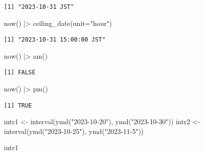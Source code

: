 \documentclass[
  letterpaper,
  DIV=11,
  numbers=noendperiod]{scrreprt}
\newenvironment{Shaded}{\begin{snugshade}}{\end{snugshade}}
\newcommand{\AttributeTok}[1]{\textcolor[rgb]{0.40,0.45,0.13}{#1}}
\newcommand{\FunctionTok}[1]{\textcolor[rgb]{0.28,0.35,0.67}{#1}}
\newcommand{\NormalTok}[1]{\textcolor[rgb]{0.00,0.23,0.31}{#1}}
\newcommand{\OtherTok}[1]{\textcolor[rgb]{0.00,0.23,0.31}{#1}}
\newcommand{\SpecialCharTok}[1]{\textcolor[rgb]{0.37,0.37,0.37}{#1}}
\newcommand{\StringTok}[1]{\textcolor[rgb]{0.13,0.47,0.30}{#1}}
\begin{document}
\begin{verbatim}
[1] "2023-10-31 JST"
\end{verbatim}

\begin{Shaded}
\begin{Highlighting}[]
\FunctionTok{now}\NormalTok{() }\SpecialCharTok{|\textgreater{}} \FunctionTok{ceiling\_date}\NormalTok{(}\AttributeTok{unit=}\StringTok{"hour"}\NormalTok{)}
\end{Highlighting}
\end{Shaded}

\begin{verbatim}
[1] "2023-10-31 15:00:00 JST"
\end{verbatim}

\begin{Shaded}
\begin{Highlighting}[]
\FunctionTok{now}\NormalTok{() }\SpecialCharTok{|\textgreater{}} \FunctionTok{am}\NormalTok{()}
\end{Highlighting}
\end{Shaded}

\begin{verbatim}
[1] FALSE
\end{verbatim}

\begin{Shaded}
\begin{Highlighting}[]
\FunctionTok{now}\NormalTok{() }\SpecialCharTok{|\textgreater{}} \FunctionTok{pm}\NormalTok{()}
\end{Highlighting}
\end{Shaded}

\begin{verbatim}
[1] TRUE
\end{verbatim}

\begin{Shaded}
\begin{Highlighting}[]
\NormalTok{intr1 }\OtherTok{\textless{}{-}}  \FunctionTok{interval}\NormalTok{(}\FunctionTok{ymd}\NormalTok{(}\StringTok{"2023{-}10{-}20"}\NormalTok{), }\FunctionTok{ymd}\NormalTok{(}\StringTok{"2023{-}10{-}30"}\NormalTok{))}
\NormalTok{intr2 }\OtherTok{\textless{}{-}}  \FunctionTok{interval}\NormalTok{(}\FunctionTok{ymd}\NormalTok{(}\StringTok{"2023{-}10{-}25"}\NormalTok{), }\FunctionTok{ymd}\NormalTok{(}\StringTok{"2023{-}11{-}5"}\NormalTok{))}

\NormalTok{intr1}
\end{Highlighting}
\end{Shaded}
\end{document}
